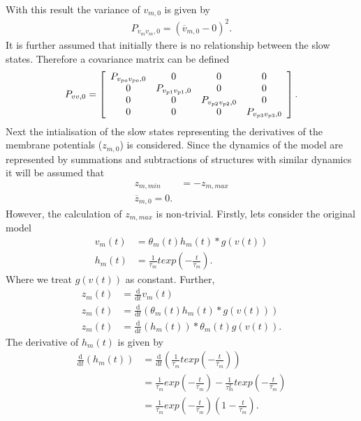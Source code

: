 With this result the variance of $v_{m,0}$ is given by \begin{align} %
P_{v_{m}v_{m},0} = (\overline{v}_{m,0} -0)^2. \end{align} It is further assumed that initially there is no relationship between the slow states. Therefore a covariance matrix can be defined
\[ P_{vv,0} = \left[ \begin{array}[pos]{cccc}
P_{v_{po}v_{po},0} &  0  & 0 & 0\\
0  &  P_{v_{p1}v_{p1},0} & 0 & 0\\
0 & 0 & P_{v_{p2}v_{p2},0} & 0\\
0  &   0  &0 & P_{v_{p3}v_{p3},0} \end{array} \right] .\] 
%
Next the intialisation of the slow states representing the derivatives of the membrane potentials ($z_{m,0}$) is considered. Since the dynamics of the model are represented by summations and subtractions of structures with similar dynamics it will be assumed that \begin{align}
z_{m,min} &= -z_{m,max}\\
\overline{z}_{m,0} = 0. \end{align} However, the calculation of $z_{m,max}$ is non-trivial. Firstly, lets consider the original model \begin{align}
v_{m}(t) &= \theta_{m}(t)h_{m}(t)*g(v(t))\\
\label{eqn: Kernel1} 
h_{m}(t) &= \frac{1}{\tau_{m}}texp\left(-\frac{t}{\tau_{m}}\right). \end{align} Where we treat $g(v(t))$ as constant. Further, \begin{align}
z_{m}(t) &=\frac{\mathrm{d}}{\mathrm{d}t}v_{m}(t) \\
z_{m}(t) &= \frac{\mathrm{d}}{\mathrm{d}t}\left(\theta_{m}(t)h_{m}(t)*g(v(t))\right)\\
z_{m}(t) &= \frac{\mathrm{d}}{\mathrm{d}t}\left(h_{m}(t)\right)*\theta_{m}(t)g(v(t)).\end{align} The derivative of $h_{m}(t)$ is given by \begin{align}%
\frac{\mathrm{d}}{\mathrm{d}t}\left(h_{m}(t)\right) &= \frac{\mathrm{d}}{\mathrm{d}t}\left(\frac{1}{\tau_{m}}texp\left(-\frac{t}{\tau_{m}}\right)\right)\\
&= \frac{1}{\tau_{m}}exp\left(-\frac{t}{\tau_{m}}\right) - \frac{1}{\tau^2_{m}}texp\left(-\frac{t}{\tau_{m}}\right)\\
&= \frac{1}{\tau_{m}}exp\left(-\frac{t}{\tau_{m}}\right)(1-\frac{t}{\tau_{m}}).

\end{align}
